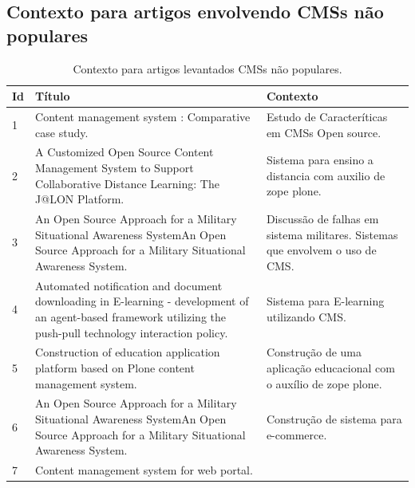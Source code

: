 \begin{apendicesenv}
\begin{landscape}
\subsection{Contexto para artigos envolvendo CMSs não populares}
\begin{longtable}{|p{10pt}|p{320pt}|p{315pt}|}
 	\caption{Contexto para artigos levantados CMSs não populares.} 
 	\label{tabela_contexto_não_populares}\\
 	\hline
 	 {\raggedright \textbf{Id}}
 	 & {\raggedright \textbf{Título}}
 	 & {\raggedright \textbf{Contexto}}\\
 	\hline
 	 {\raggedright 1}
 	 & {\raggedright 
 	 Content management system : Comparative case study.}
 	 & {\raggedright Estudo de Caracteríticas em CMSs Open source. \cite{Nath_Arora}}\\
 	\hline
 	 {\raggedright 2}
 	 & {\raggedright A {Customized} {Open} {Source} {Content} {Management} {System} to {Support} {Collaborative} {Distance} {Learning}: {The} {J}@{LON} {Platform}.}
 	 & {\raggedright Sistema para ensino a distancia com auxilio de zope plone.\cite{Staccini2007} }\\
 	\hline
 	 {\raggedright 3} 
 	 & {\raggedright An {Open} {Source} {Approach} for a {Military} {Situational} {Awareness} {System}An {Open} {Source} {Approach} for a {Military} {Situational} {Awareness} {System}.}
& {\raggedright Discussão de falhas em sistema militares. Sistemas que envolvem o uso de CMS. \cite{Loechel2012}
}\\
 	\hline
 {\raggedright 4}
 	 & {\raggedright 
 	 Automated notification and document downloading in {E}-learning - development of an agent-based framework utilizing the push-pull technology interaction policy.}
 	 & {\raggedright Sistema para E-learning utilizando CMS.
 	  \cite{Latif2008}}\\
 	\hline
 	 {\raggedright 5}
 	 & {\raggedright Construction of education application platform based on {Plone} content management system.}
 	 & {\raggedright Construção de uma aplicação educacional com o auxílio de zope plone.\cite{Jiugen2012} }\\
 	\hline
 	 {\raggedright 6} 
 	 & {\raggedright An {Open} {Source} {Approach} for a {Military} {Situational} {Awareness} {System}An {Open} {Source} {Approach} for a {Military} {Situational} {Awareness} {System}.}
& {\raggedright Construção de sistema para e-commerce. \cite{Kiatruangkrai2010}
}\\
 	\hline
 {\raggedright 7}
 	 & {\raggedright 
 	 Content management system for web portal.}

\end{longtable}
\end{landscape}
\end{apendicesenv}

